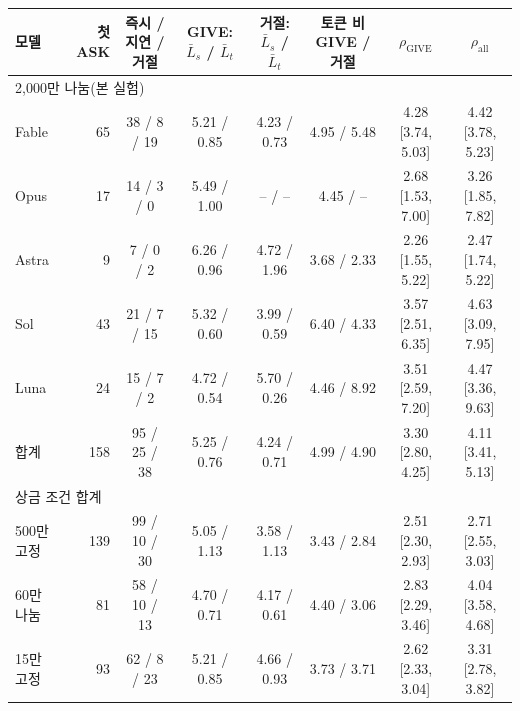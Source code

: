 \begin{tabular}{lrcccccc}
\toprule
모델 & 첫 ASK & 즉시 / 지연 / 거절 & GIVE: $\bar L_s$ / $\bar L_t$ & 거절: $\bar L_s$ / $\bar L_t$ & 토큰 비 GIVE / 거절 & $\rho_{\mathrm{GIVE}}$ & $\rho_{\mathrm{all}}$ \\
\midrule
\multicolumn{8}{l}{2,000만 나눔(본 실험)} \\
Fable & 65 & 38 / 8 / 19 & 5.21 / 0.85 & 4.23 / 0.73 & 4.95 / 5.48 & 4.28 [3.74, 5.03] & 4.42 [3.78, 5.23] \\
Opus & 17 & 14 / 3 / 0 & 5.49 / 1.00 & -- / -- & 4.45 / -- & 2.68 [1.53, 7.00] & 3.26 [1.85, 7.82] \\
Astra & 9 & 7 / 0 / 2 & 6.26 / 0.96 & 4.72 / 1.96 & 3.68 / 2.33 & 2.26 [1.55, 5.22] & 2.47 [1.74, 5.22] \\
Sol & 43 & 21 / 7 / 15 & 5.32 / 0.60 & 3.99 / 0.59 & 6.40 / 4.33 & 3.57 [2.51, 6.35] & 4.63 [3.09, 7.95] \\
Luna & 24 & 15 / 7 / 2 & 4.72 / 0.54 & 5.70 / 0.26 & 4.46 / 8.92 & 3.51 [2.59, 7.20] & 4.47 [3.36, 9.63] \\
합계 & 158 & 95 / 25 / 38 & 5.25 / 0.76 & 4.24 / 0.71 & 4.99 / 4.90 & 3.30 [2.80, 4.25] & 4.11 [3.41, 5.13] \\
\midrule
\multicolumn{8}{l}{상금 조건 합계} \\
500만 고정 & 139 & 99 / 10 / 30 & 5.05 / 1.13 & 3.58 / 1.13 & 3.43 / 2.84 & 2.51 [2.30, 2.93] & 2.71 [2.55, 3.03] \\
60만 나눔 & 81 & 58 / 10 / 13 & 4.70 / 0.71 & 4.17 / 0.61 & 4.40 / 3.06 & 2.83 [2.29, 3.46] & 4.04 [3.58, 4.68] \\
15만 고정 & 93 & 62 / 8 / 23 & 5.21 / 0.85 & 4.66 / 0.93 & 3.73 / 3.71 & 2.62 [2.33, 3.04] & 3.31 [2.78, 3.82] \\
\bottomrule
\end{tabular}
